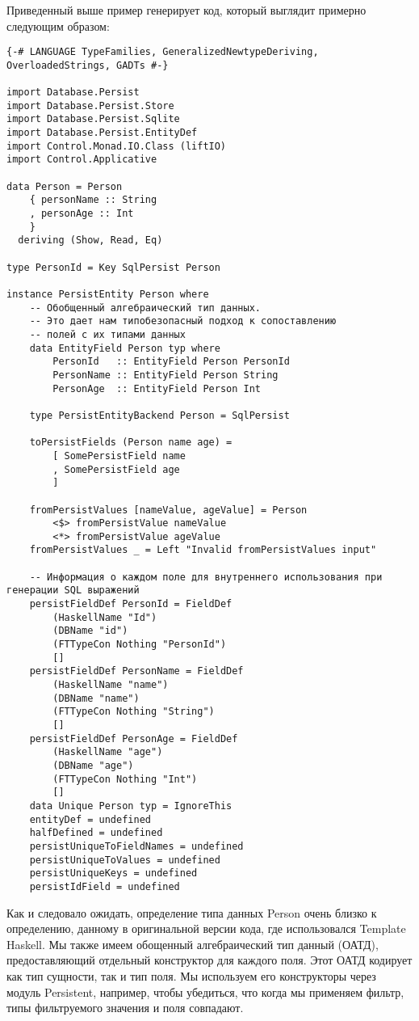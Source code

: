 Приведенный выше пример генерирует код, который выглядит примерно следующим образом:

\begin{lstlisting}
{-# LANGUAGE TypeFamilies, GeneralizedNewtypeDeriving, OverloadedStrings, GADTs #-}

import Database.Persist
import Database.Persist.Store
import Database.Persist.Sqlite
import Database.Persist.EntityDef
import Control.Monad.IO.Class (liftIO)
import Control.Applicative

data Person = Person
    { personName :: String
    , personAge :: Int
    }
  deriving (Show, Read, Eq)

type PersonId = Key SqlPersist Person

instance PersistEntity Person where
    -- Обобщенный алгебраический тип данных.
    -- Это дает нам типобезопасный подход к сопоставлению
    -- полей с их типами данных
    data EntityField Person typ where
        PersonId   :: EntityField Person PersonId
        PersonName :: EntityField Person String
        PersonAge  :: EntityField Person Int

    type PersistEntityBackend Person = SqlPersist

    toPersistFields (Person name age) =
        [ SomePersistField name
        , SomePersistField age
        ]

    fromPersistValues [nameValue, ageValue] = Person
        <$> fromPersistValue nameValue
        <*> fromPersistValue ageValue
    fromPersistValues _ = Left "Invalid fromPersistValues input"

    -- Информация о каждом поле для внутреннего использования при генерации SQL выражений
    persistFieldDef PersonId = FieldDef
        (HaskellName "Id")
        (DBName "id")
        (FTTypeCon Nothing "PersonId")
        []
    persistFieldDef PersonName = FieldDef
        (HaskellName "name")
        (DBName "name")
        (FTTypeCon Nothing "String")
        []
    persistFieldDef PersonAge = FieldDef
        (HaskellName "age")
        (DBName "age")
        (FTTypeCon Nothing "Int")
        []
    data Unique Person typ = IgnoreThis
    entityDef = undefined
    halfDefined = undefined
    persistUniqueToFieldNames = undefined
    persistUniqueToValues = undefined
    persistUniqueKeys = undefined
    persistIdField = undefined
\end{lstlisting}%

Как и следовало ожидать, определение типа данных Person очень близко к определению, данному в оригинальной версии кода, где использовался Template Haskell. Мы также имеем обощенный алгебраический тип данный (ОАТД), предоставляющий отдельный конструктор для каждого поля. Этот ОАТД кодирует как тип сущности, так и тип поля. Мы используем его конструкторы через модуль Persistent, например, чтобы убедиться, что когда мы применяем фильтр, типы фильтруемого значения и поля совпадают.

